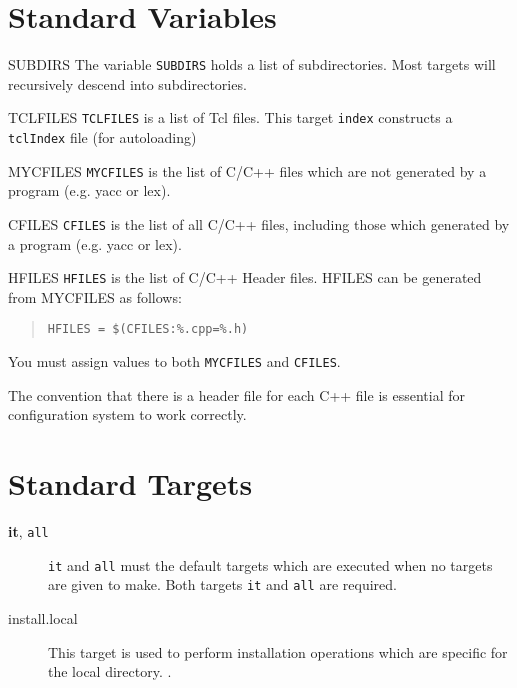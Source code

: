\documentclass[twoside,fleqn]{report}
\begin{document}
%
%

\section{Standard Variables}

\begin{ttdescription}

  \item[SUBDIRS]  
  The variable \texttt{SUBDIRS} holds a list of subdirectories.
  Most targets will recursively descend into subdirectories.  

  \item[TCLFILES]
  \texttt{TCLFILES} is a list of Tcl files. This target
  \texttt{index} constructs a \texttt{tclIndex}
  file (for autoloading)

  \item[MYCFILES]
  \texttt{MYCFILES} is the list of C/C++ files which
  are not generated by a program (e.g. yacc or lex).
  
  \item[CFILES]
  \texttt{CFILES} is the list of all C/C++ files,
  including those which generated by a program (e.g. yacc or lex).
  
  \item[HFILES]
  \texttt{HFILES} is the list of C/C++ Header files.
  HFILES can be generated from MYCFILES as follows:
  \begin{quote}
    \texttt{HFILES = \$(CFILES:\%.cpp=\%.h)}
  \end{quote}
\end{ttdescription}


\begin{notes}
  \item You must assign values to both \texttt{MYCFILES} and 
  \texttt{CFILES}.
  \item The convention that there is a header file for each C++ file is 
  essential for configuration system to work correctly.
\end{notes}

%
%

\section{Standard Targets}

\begin{description}

  \item[\textbf{it}, \texttt{all}]
  \texttt{it} and \texttt{all} must the default targets 
  which are executed when no targets are given to make.
  Both targets \texttt{it} and \texttt{all} are required.

  \item[install.local]
  This target is used to perform installation operations which are
  specific for the local directory. \TBD{}.

\end{description}
\end{document}
